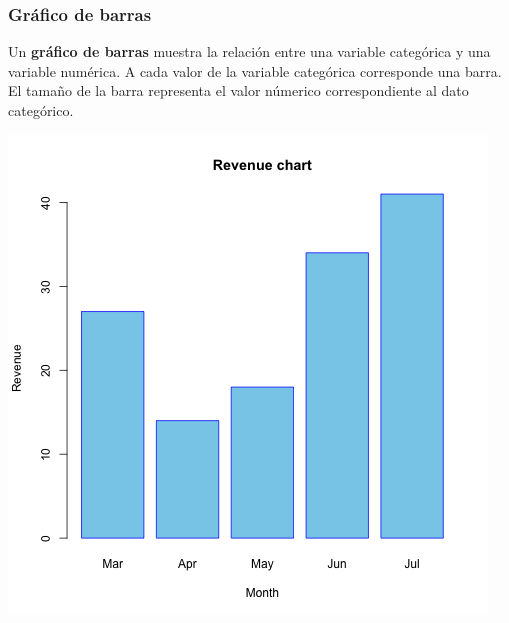 \documentclass[aspectratio=169,12pt]{beamer}
\begin{document}

\begin{frame}
\frametitle{Gráfico de barras}

\begin{minipage}{.55\textwidth}
Un \textbf{gráfico de barras} muestra la relación entre una variable categórica y una variable numérica. A cada valor de la variable categórica corresponde una barra. El tamaño de la barra representa el valor númerico correspondiente al dato categórico.
\end{minipage} \hspace{1cm} %
\begin{minipage}{.35\textwidth}
\begin{center}
\includegraphics[scale=0.30]{clase4-barchart_months_revenue_sample.png}
\end{center}
\end{minipage}
\end{frame}


\end{document}
